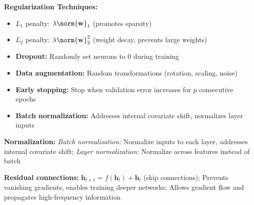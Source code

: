 \textbf{Regularization Techniques:}
\begin{itemize}
    \item $L_1$ penalty: $\lambda \norm{\mathbf{w}}_1$ (promotes sparsity)
    \item $L_2$ penalty: $\lambda \norm{\mathbf{w}}_2^2$ (weight decay, prevents large weights)
    \item \textbf{Dropout:} Randomly set neurons to $0$ during training
    \item \textbf{Data augmentation:} Random transformations (rotation, scaling, noise)
    \item \textbf{Early stopping:} Stop when validation error increases for $p$ consecutive epochs
    \item \textbf{Batch normalization:} Addresses internal covariate shift, normalizes layer inputs
\end{itemize}

\textbf{Normalization:} \textit{Batch normalization:} Normalize inputs to each layer, addresses internal covariate shift; \textit{Layer normalization:} Normalize across features instead of batch

\textbf{Residual connections:} $\mathbf{h}_{l+1} = f(\mathbf{h}_l) + \mathbf{h}_l$ (skip connections); Prevents vanishing gradients, enables training deeper networks; Allows gradient flow and propagates high-frequency information


